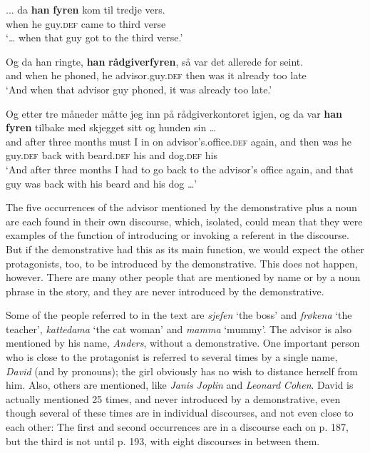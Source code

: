 \documentclass[output=paper,colorlinks,citecolor=brown]{langscibook}
\begin{document}
\ea\label{ex:johannessen:12}
 \gll ... da \textbf{han} \textbf{fyren} kom til tredje vers.\\
     {} when he guy.\textsc{def} came to third verse\\
\glt ‘… when that guy got to the third verse.’ \citep[188, top]{Rishoi2014}
\z

\ea\label{ex:johannessen:13}
 \gll Og da han ringte, \textbf{han} \textbf{rådgiverfyren}, så var det allerede for seint. \\
     and when he phoned, he advisor.guy.\textsc{def} then was it already too late\\
\glt ‘And when that advisor guy phoned, it was already too late.’ \citep[190, bottom]{Rishoi2014}
\z

\ea\label{ex:johannessen:14}
 \gll Og etter tre måneder måtte jeg inn på rådgiverkontoret igjen, og da var \textbf{han} \textbf{fyren} tilbake med skjegget sitt og hunden sin … \\
     and after three months must I in on advisor’s.office\textsc{.def} again, and then was he guy.\textsc{def} back with beard.\textsc{def} his and dog.\textsc{def} his\\
\glt ‘And after three months I had to go back to the advisor’s office again, and that guy was back with his beard and his dog …’ \citep[198, top]{Rishoi2014}
\z

The five occurrences of the advisor mentioned by the demonstrative plus a noun are each found in their own discourse, which, isolated, could mean that they were examples of the function of introducing or invoking a referent in the discourse. But if the demonstrative had this as its main function, we would expect the other protagonists, too, to be introduced by the demonstrative. This does not happen, however. There are many other people that are mentioned by name or by a noun phrase in the story, and they are never introduced by the demonstrative. 

Some of the people referred to in the text are \textit{sjefen} ‘the boss’ and \textit{frøkena} ‘the teacher’, \textit{kattedama} ‘the cat woman’ and \textit{mamma} ‘mummy’. The advisor is also mentioned by his name, \textit{Anders}, without a demonstrative. One important person who is close to the protagonist is referred to several times by a single name, \textit{David} (and by pronouns); the girl obviously has no wish to distance herself from him. Also, others are mentioned, like \textit{Janis} \textit{Joplin} and \textit{Leonard} \textit{Cohen}. David is actually mentioned 25 times, and never introduced by a demonstrative, even though several of these times are in individual discourses, and not even close to each other: The first and second occurrences are in a discourse each on p. 187, but the third is not until p. 193, with eight discourses in between them. 
\end{document}
